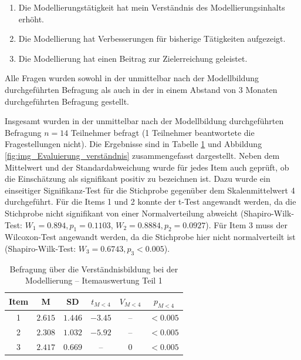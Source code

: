 \begin{enumerate}
	\item Die Modellierungstätigkeit hat mein Verständnis des Modellierungsinhalts erhöht.
	\item Die Modellierung hat Verbesserungen für bisherige Tätigkeiten aufgezeigt.
	\item Die Modellierung hat einen Beitrag zur Zielerreichung geleistet.
\end{enumerate}

Alle Fragen wurden sowohl in der unmittelbar nach der Modellbildung durchgeführten Befragung als auch in der in einem Abstand von 3 Monaten durchgeführten Befragung gestellt.

Insgesamt wurden in der unmittelbar nach der Modellbildung durchgeführten Befragung $n=14$ Teilnehmer befragt (1 Teilnehmer beantwortete die Fragestellungen nicht). Die Ergebnisse sind in Tabelle \ref{tab:verständnis} und Abbildung \ref{fig:img_Evaluierung_verständnis} zusammengefasst dargestellt. Neben dem Mittelwert und der Standardabweichung wurde für jedes Item auch geprüft, ob die Einschätzung als signifikant positiv zu bezeichnen ist. Dazu wurde ein einseitiger Signifikanz-Test für die Stichprobe gegenüber dem Skalenmittelwert 4 durchgeführt. Für die Items 1 und 2 konnte der t-Test angewandt werden, da die Stichprobe nicht signifikant von einer Normalverteilung abweicht (Shapiro-Wilk-Test: $W_{1}=0.894, p_{1}=0.1103$, $W_{2}=0.8884, p_{2}=0.0927$). Für Item 3 muss der Wilcoxon-Test angewandt werden, da die Stichprobe hier nicht normalverteilt ist (Shapiro-Wilk-Test: $W_{3}=0.6743, p_{3}<0.005$).

\begin{table}[htbp]
	\centering
	\caption{Befragung über die Verständnisbildung bei der Modellierung -- Itemauswertung Teil 1}

\begin{tabular}{| c || c | c || c | c | c |}
  \hline
   Item & M & SD & $t_{M<4}$ & $V_{M<4}$ & $p_{M<4}$ \\ \hline
   1  & $2.615$ & $1.446$ & $-3.45$ & -- & $<0.005$ \\ 
   2  & $2.308$ & $1.032$ & $-5.92$ & -- & $<0.005$ \\ 
   3  & $2.417$ & $0.669$ & -- & $0$ & $<0.005$ \\ \hline
\end{tabular} \\ 
	\label{tab:verständnis}
\end{table}

